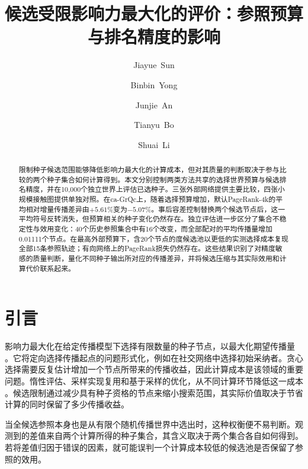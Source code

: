 \documentclass[smallextended]{svjour3}
\begin{document}
\def\abstractname{摘要}\def\keywordname{\textbf{关键词}}\def\figurename{图}\def\tablename{表}\def\refname{参考文献}
\title{候选受限影响力最大化的评价：参照预算与排名精度的影响}
\author{\mbox{Jiayue Sun} \and \mbox{Binbin Yong} \and \mbox{Junjie An} \and \mbox{Tianyu Bo} \and \mbox{Shuai Li}}
\date{}
\maketitle
\begin{abstract}
限制种子候选范围能够降低影响力最大化的计算成本，但对其质量的判断取决于参与比较的两个种子集合如何计算得到。本文分别控制两类方法共享的选择世界预算与候选排名精度，并在10,000个独立世界上评估已选种子。三张外部网络提供主要比较，四张小规模接触图提供单独对照。在ca-GrQc上，随着选择预算增加，默认PageRank-4k的平均相对增量传播差异由$+5.61$\%变为$-5.07$\%。事后容差控制替换两个候选节点后，这一平均符号反转消失，但预算相关的种子变化仍然存在。独立评估进一步区分了集合不稳定性与效用变化：40个历史参照集合中有16个改变，而全部配对的平均传播量增加0.01111个节点。在最高外部预算下，含20个节点的度候选池以更低的实测选择成本复现全部15条参照轨迹；有向网络上的PageRank损失仍然存在。这些结果识别了对精度敏感的质量判断，量化不同种子输出所对应的传播差异，并将候选压缩与其实际效用和计算代价联系起来。
\end{abstract}

\section{引言}
影响力最大化在给定传播模型下选择有限数量的种子节点，以最大化期望传播量 \cite{ref1}。它将定向选择传播起点的问题形式化，例如在社交网络中选择初始采纳者。贪心选择需要反复估计增加一个节点所带来的传播收益，因此计算成本是该领域的重要问题。惰性评估、采样实现复用和基于采样的优化，从不同计算环节降低这一成本 \cite{ref7,ref8,ref2}。候选限制通过减少具有种子资格的节点来缩小搜索范围，其实际价值取决于节省计算的同时保留了多少传播收益。

当全候选参照本身也是从有限个随机传播世界中选出时，这种权衡便不易判断。观测到的差值来自两个计算所得的种子集合，其含义取决于两个集合各自如何得到。若将差值归因于错误的因素，就可能误判一个计算成本较低的候选池是否保留了参照的效用。
\end{document}

